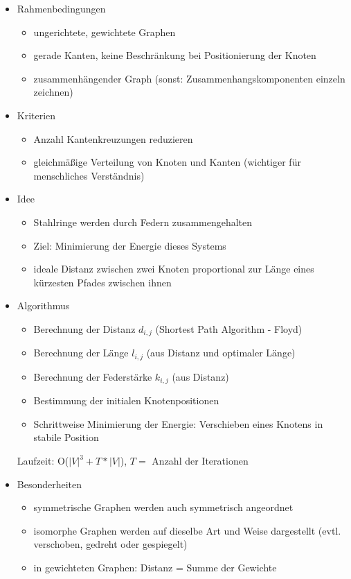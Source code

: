 \documentclass[a4paper,12pt,ngerman]{scrartcl}
\begin{document}
\begin{itemize}
\item Rahmenbedingungen
\begin{itemize}
\item ungerichtete, gewichtete Graphen
\item gerade Kanten, keine Beschränkung bei Positionierung der Knoten
\item zusammenhängender Graph (sonst: Zusammenhangskomponenten einzeln zeichnen)
\end{itemize}
\item Kriterien
\begin{itemize}
\item Anzahl Kantenkreuzungen reduzieren
\item gleichmäßige Verteilung von Knoten und Kanten (wichtiger für menschliches Verständnis)
\end{itemize}
\item Idee
\begin{itemize}
\item Stahlringe werden durch Federn zusammengehalten
\item Ziel: Minimierung der Energie dieses Systems
\item ideale Distanz zwischen zwei Knoten proportional zur Länge eines kürzesten Pfades zwischen ihnen
\end{itemize}
\item Algorithmus
\begin{itemize}
\item Berechnung der Distanz $d_{i,j}$  (Shortest Path Algorithm - Floyd)
\item Berechnung der Länge $l_{i,j}$ (aus Distanz und optimaler Länge)
\item Berechnung der Federstärke $k_{i,j}$ (aus Distanz)
\item Bestimmung der initialen Knotenpositionen
\item Schrittweise Minimierung der Energie: Verschieben eines Knotens in stabile Position
\end{itemize}

Laufzeit: O($|V|^3 + T * |V|$), $T =$ Anzahl der Iterationen
\item Besonderheiten
\begin{itemize}
\item symmetrische Graphen werden auch symmetrisch angeordnet
\item isomorphe Graphen werden auf dieselbe Art und Weise dargestellt (evtl. verschoben, gedreht oder gespiegelt)
\item in gewichteten Graphen: Distanz = Summe der Gewichte
\end{itemize}
\end{itemize}
\end{document}
